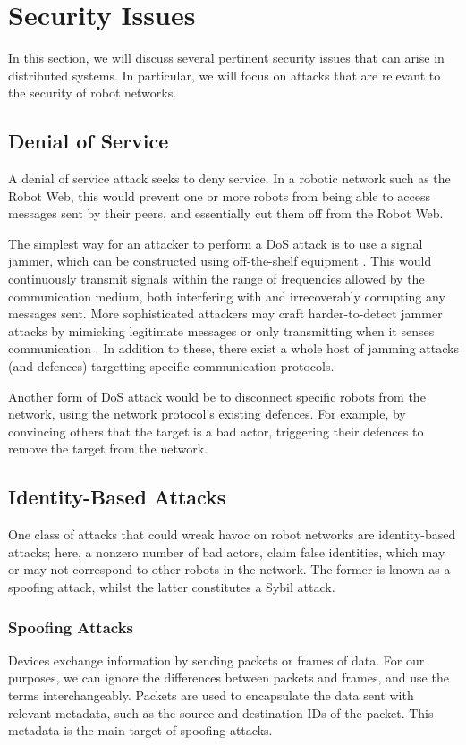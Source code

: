 \section{Security Issues}
In this section, we will discuss several pertinent security issues that can arise in distributed systems. In particular, we will focus on attacks that are relevant to the security of robot networks.

\subsection{Denial of Service} %
A denial of service attack seeks to deny service. In a robotic network such as the Robot Web, this would prevent one or more robots from being able to access messages sent by their peers, and essentially cut them off from the Robot Web.

The simplest way for an attacker to perform a DoS attack is to use a signal jammer, which can be constructed using off-the-shelf equipment \cite{SignalJamming}. This would continuously transmit signals within the range of frequencies allowed by the communication medium, both interfering with and irrecoverably corrupting any messages sent. More sophisticated attackers may craft harder-to-detect jammer attacks by mimicking legitimate messages or only transmitting when it senses communication \cite{SignalJamming}. In addition to these, there exist a whole host of jamming attacks (and defences) targetting specific communication protocols.

Another form of DoS attack would be to disconnect specific robots from the network, using the network protocol's existing defences. For example, by convincing others that the target is a bad actor, triggering their defences to remove the target from the network. %

\subsection{Identity-Based Attacks}
One class of attacks that could wreak havoc on robot networks are identity-based attacks; here, a nonzero number of bad actors, claim false identities, which may or may not correspond to other robots in the network. The former is known as a spoofing attack, whilst the latter constitutes a Sybil attack.

\subsubsection{Spoofing Attacks}
Devices exchange information by sending packets or frames of data. For our purposes, we can ignore the differences between packets and frames, and use the terms interchangeably. Packets are used to encapsulate the data sent with relevant metadata, such as the source and destination IDs of the packet. This metadata is the main target of spoofing attacks.

